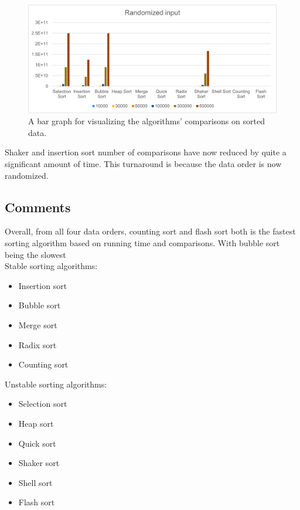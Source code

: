 \documentclass{article}
\begin{document}
\begin{figure}[H]
\includegraphics[scale = 0.8]{RandomBar.png}
\caption{A bar graph for visualizing the algorithms’ comparisons on sorted data.}
\centering
\end{figure}

Shaker and insertion sort number of comparisons have now reduced by quite a significant amount of time. This turnaround is because the data order is now randomized.

\pagebreak

\subsection{Comments}
Overall, from all four data orders, counting sort and flash sort both is the fastest sorting algorithm based on running time and comparisons. With bubble sort being the slowest\\
Stable sorting algorithms:
\begin{itemize}
    \item Insertion sort
    \item Bubble sort
    \item Merge sort
    \item Radix sort
    \item Counting sort
\end{itemize}
Unstable sorting algorithms:
\begin{itemize}
    \item Selection sort
    \item Heap sort
    \item Quick sort
    \item Shaker sort
    \item Shell sort
    \item Flash sort
\end{itemize}


\bigskip

\pagebreak
\end{document}
